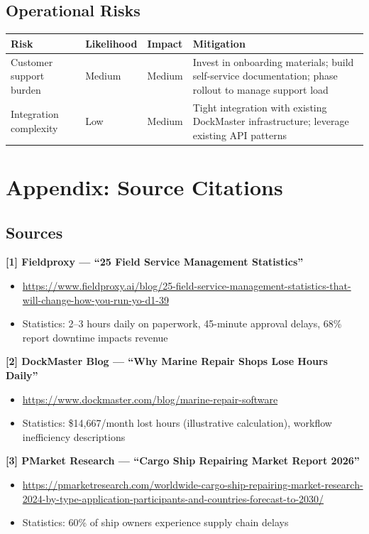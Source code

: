 \documentclass[11pt,a4paper]{article}
\begin{document}
\subsection{Operational Risks}

\begin{table}[H]
\centering
\small
\begin{tabularx}{\textwidth}{@{}L{3cm}C{1.8cm}C{1.5cm}L{6cm}@{}}
\toprule
\textbf{Risk} & \textbf{Likelihood} & \textbf{Impact} & \textbf{Mitigation} \\
\midrule
Customer support burden & Medium & Medium & Invest in onboarding materials; build self-service documentation; phase rollout to manage support load \\
\addlinespace
Integration complexity & Low & Medium & Tight integration with existing DockMaster infrastructure; leverage existing API patterns \\
\bottomrule
\end{tabularx}
\end{table}

\newpage
\section{Appendix: Source Citations}

\subsection*{Sources}

\textbf{[1] Fieldproxy --- ``25 Field Service Management Statistics''}
\begin{itemize}[leftmargin=*]
    \item \url{https://www.fieldproxy.ai/blog/25-field-service-management-statistics-that-will-change-how-you-run-yo-d1-39}
    \item Statistics: 2--3 hours daily on paperwork, 45-minute approval delays, 68\% report downtime impacts revenue
\end{itemize}

\textbf{[2] DockMaster Blog --- ``Why Marine Repair Shops Lose Hours Daily''}
\begin{itemize}[leftmargin=*]
    \item \url{https://www.dockmaster.com/blog/marine-repair-software}
    \item Statistics: \$14,667/month lost hours (illustrative calculation), workflow inefficiency descriptions
\end{itemize}

\textbf{[3] PMarket Research --- ``Cargo Ship Repairing Market Report 2026''}
\begin{itemize}[leftmargin=*]
    \item \url{https://pmarketresearch.com/worldwide-cargo-ship-repairing-market-research-2024-by-type-application-participants-and-countries-forecast-to-2030/}
    \item Statistics: 60\% of ship owners experience supply chain delays
\end{itemize}
\end{document}
